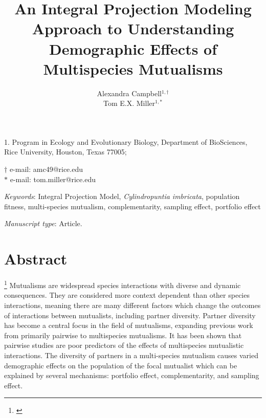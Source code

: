 \documentclass[11pt]{article}
\title{An Integral Projection Modeling Approach to Understanding Demographic Effects of Multispecies Mutualisms}
\author{Alexandra Campbell$^{1,\dagger}$ \\ 
	Tom E.X. Miller$^{1,\ast}$}
\date{}
\newcommand{\tom}[2]{{\color{red}{#1}}\footnote{\textit{\color{red}{#2}}}}
\begin{document}
	
	\maketitle
	
	\noindent{} 1. Program in Ecology and Evolutionary Biology, Department of BioSciences, Rice University, Houston, Texas 77005;
	
	\noindent{} $\dagger$ e-mail: amc49@rice.edu\\
	\noindent{} $\ast$ e-mail: tom.miller@rice.edu
	
	\bigskip
	
	\textit{Keywords}:  Integral Projection Model, \textit{Cylindropuntia imbricata}, population fitness, multi-species mutualism, complementarity, sampling effect, portfolio effect
	
	\bigskip
	
	\textit{Manuscript type}: Article.
	
	\bigskip
	
	
\linenumbers{}
\modulolinenumbers[3]

\newpage{}

\section*{Abstract}
\tom{}{I think this is too long for Am Nat requirements. Also, use ``we''. I think you just pasted in an abstract that you used elsewhere, so I will work on this once you write a real abstract for the Am Nat paper.}
Mutualisms are widespread species interactions with diverse and dynamic consequences. 
They are considered more context dependent than other species interactions, meaning there are many different factors which change the outcomes of interactions between mutualists, including partner diversity. 
Partner diversity has become a central focus in the field of mutualisms, expanding previous work from primarily pairwise to multispecies mutualisms. 
It has been shown that pairwise studies are poor predictors of the effects of multispecies mutualistic interactions. 
The diversity of partners in a multi-species mutualism causes varied demographic effects on the population of the focal mutualist which can be explained by several mechanisms: portfolio effect, complementarity, and sampling effect. 
\end{document}
